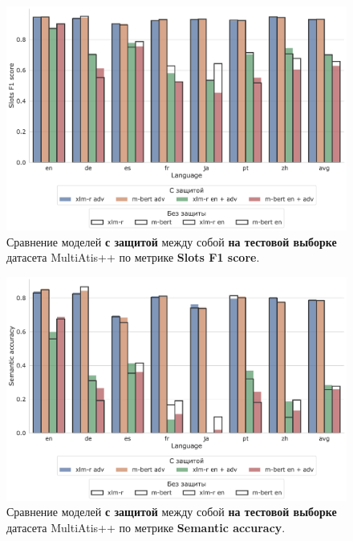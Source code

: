 \begin{figure}[h!]
    \centering
    \includegraphics[width=\textwidth]{images/10}
    \caption{Сравнение моделей \textbf{с защитой} между собой \textbf{на тестовой выборке} датасета MultiAtis++ по метрике \textbf{Slots F1 score}.}\label{fig:figure10}
\end{figure}
\begin{figure}[h!]
    \centering
    \includegraphics[width=\textwidth]{images/11}
    \caption{Сравнение моделей \textbf{с защитой} между собой \textbf{на тестовой выборке} датасета MultiAtis++ по метрике \textbf{Semantic accuracy}.}\label{fig:figure11}
\end{figure}

